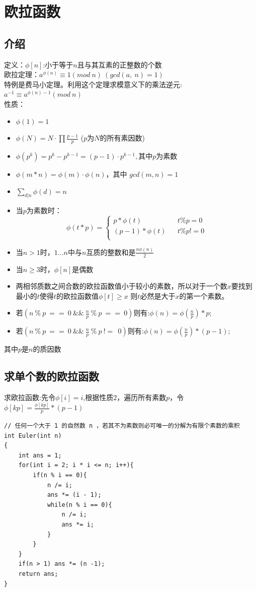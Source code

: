 \section{欧拉函数}

\subsection{介绍}

定义：$\phi[n]$:小于等于$n$且与其互素的正整数的个数 \\
欧拉定理：$a^{\phi(n)} \equiv 1(mod\ n)\ (gcd(a,\ n) = 1)$ \\
特例是费马小定理。利用这个定理求模意义下的乘法逆元:$a^{-1}\equiv a^{\phi(n)-1}(mod\ n)$ \\
性质：
\begin{itemize}
\item $\phi(1) = 1$
\item $\phi(N) = N· \prod \frac{p-1}{p}$ ($p$为$N$的所有素因数)
\item $\phi(p^k)= p^k−p^{k−1} = (p−1)·p^{k−1},$其中$p$为素数
\item $\phi(m * n) = \phi(m)·\phi(n)$，其中 $gcd(m,n) = 1$
\item $\sum_{d|n}{}\phi(d) = n$
\item 当$p$为素数时：$$\phi(t * p)=\left\{
 \begin{array}{rcl}
 p*\phi(t)& & t \% p =0 \\
 (p-1)*\phi(t)& & t \% p != 0\\
 \end{array}\right.$$
\item 当$n>1$时，$1...n$中与$n$互质的整数和是$\frac{n\phi(n)}{2}$
\item 当$n \geq 3$时，$\phi[n]$是偶数
\item 两相邻质数之间合数的欧拉函数值小于较小的素数，所以对于一个数$x$要找到最小的$t$使得$t$的欧拉函数值$\phi[t] \geq x$ 则$t$必然是大于$x$的第一个素数。
\item 若$(n\ \%\ p\ ==\ 0\ \&\&\ \frac{n}{p}\ \%\ p\ ==\ 0)$则有:$\phi (n)=\phi (\frac{n}{p})*p$;
\item 若$(n\ \%\ p\ ==\ 0\ \&\&\ \frac{n}{p}\ \%\ p\ !=\ \ 0)$则有:$\phi (n)=\phi (\frac{n}{p})*(p-1)$;
\end{itemize}
其中$p$是$n$的质因数

\subsection{求单个数的欧拉函数}
求欧拉函数:先令$\phi[i] = i$,根据性质$2$，遍历所有素数$p$，令$\phi[kp] = \frac{\phi[kp]}{ p }* (p − 1)$
\begin{lstlisting}
// 任何一个大于 1 的自然数 n ，若其不为素数则必可唯一的分解为有限个素数的乘积
int Euler(int n)
{
    int ans = 1;
    for(int i = 2; i * i <= n; i++){
        if(n % i == 0){
            n /= i;
            ans *= (i - 1);
            while(n % i == 0){
                n /= i;
                ans *= i;
            }
        }
    }
    if(n > 1) ans *= (n -1);
    return ans;
}
\end{lstlisting}

